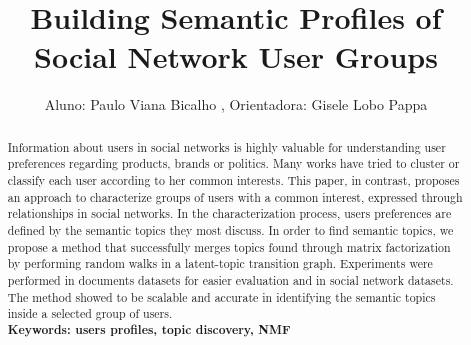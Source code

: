 \documentclass[12pt]{article}
\title{Building Semantic Profiles of Social Network User Groups}
\author{Aluno: Paulo Viana Bicalho \inst{1}, Orientadora: Gisele Lobo Pappa \inst{1} }
\begin{document}
\newcommand{\fhmourao}[1]{{\color{red}[#1]}}
\newcommand{\gi}[1]{{\color{blue}[#1]}}
\newcommand{\method}{UPsCAle }













\date{}

\maketitle

 

\begin{abstract} \small\baselineskip=9pt 
Information about users in social networks is highly valuable for
understanding user preferences regarding products, brands or politics. Many
works have tried to cluster or classify each user according to her common
interests. This paper, in contrast, proposes an approach to characterize
groups of users with a common interest, expressed through relationships in
social networks. In the characterization process, users preferences are
defined by the semantic topics they most discuss. In order to find semantic
topics, we propose a method that successfully merges topics found through
matrix factorization by performing random walks in a latent-topic transition
graph. Experiments were performed in documents datasets for easier evaluation
and in social network datasets. The method showed to be scalable and accurate
in identifying the semantic topics inside a selected group of users.\\
\textbf{Keywords: users profiles, topic discovery, NMF}
\end{abstract}

 









\end{document}
